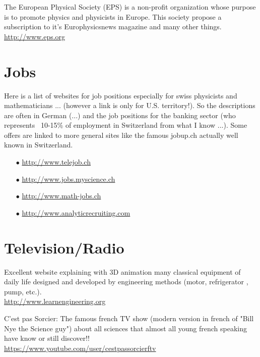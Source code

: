 		{\Large {}}{\Large {}}{\Large {}} The European Physical Society (EPS) is a non-profit organization whose purpose is to promote physics and physicists in Europe. This society propose a subscription to it's Europhysicsnews magazine and many other things.\\
		\href{http://www.eps.org}{\color{blue}http://www.eps.org}

	\pagebreak
	\section{Jobs}
	
	{\Large {}} Here is a list of websites for job positions especially for swiss physicists and mathematicians ... (however a link is only for U.S. territory!). So the descriptions are often in German (...) and the job positions for the banking sector (who represents ~10-15\% of employment in Switzerland from what I know ...). Some offers are linked to more general sites like the famous jobup.ch actually well known in Switzerland.
	
	\begin{itemize}	 
		\item[$\bullet$] \href{http://www.telejob.ch}{\color{blue}http://www.telejob.ch} 
	
		\item[$\bullet$] \href{http://www.jobs.myscience.ch}{\color{blue}http://www.jobs.myscience.ch}
	
		\item[$\bullet$] \href{http://www.math-jobs.ch}{\color{blue}http://www.math-jobs.ch}
	
		\item[$\bullet$] \href{http://www.analyticrecruiting.com}{\color{blue}http://www.analyticrecruiting.com}
	\end{itemize}
	
	\section{Television/Radio}

	{\Large {}} Excellent website explaining with 3D animation many classical equipment of daily life designed and developed by engineering methods (motor, refrigerator , pump, etc.).\\
	\href{http://www.learnengineering.org}{\color{blue}http://www.learnengineering.org}
	
	\bcdfrance{} C'est pas Sorcier: The famous french TV show (modern version in french of "Bill Nye the Science guy") about all sciences that almost all young french speaking have know or still discover!!\\
	\href{https://www.youtube.com/user/cestpassorcierftv}{\color{blue}https://www.youtube.com/user/cestpassorcierftv}
	
